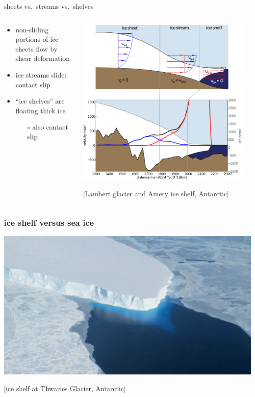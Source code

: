 \documentclass[hide notes,intlimits]{beamer}
\newcommand{\contactslipslide}{
\begin{frame}{sheets vs.~streams vs.~shelves}

\begin{columns}
\begin{column}{0.35\textwidth}
\small
\begin{itemize}
\small
\item non-sliding portions of ice sheets flow by shear deformation
\item ice streams slide: \alert{contact slip}
\item ``ice shelves'' are floating thick ice
  \begin{itemize}
  \scriptsize
  \item[$\circ$] also \alert{contact slip}
  \end{itemize}
\end{itemize}
\end{column}

\begin{column}{0.65\textwidth}

\hfill\includegraphics[width=0.95\textwidth]{siassacartoon-lambert}

\begin{center}
\vspace{-0.18in}
\tiny [Lambert glacier and Amery ice shelf, Antarctic]
\end{center}
\end{column}
\end{columns}
\end{frame}
}
\begin{document}
\contactslipslide


\begin{frame}
  \frametitle{ice shelf versus sea ice}

\begin{center}
\vspace{-0.2in}

\includegraphics[width=1.0\textwidth]{supp4rignot-small}

\medskip
\tiny [ice shelf at Thwaites Glacier, Antarctic]
\end{center}
\end{frame}
\end{document}
